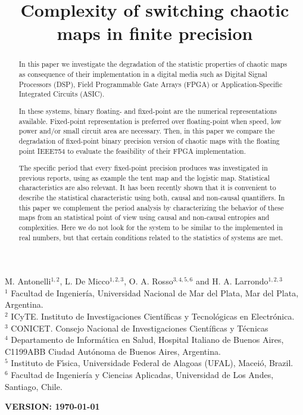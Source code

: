 \begin{frontmatter}

	\title{Complexity of switching chaotic maps in finite precision}
	M. Antonelli$^{1,2}$, L. De Micco$^{1,2,3}$, O. A. Rosso$^{3,4,5,6}$ and H. A. Larrondo$^{1,2,3}$\\
	$^{1}$ Facultad de Ingenier\'ia, Universidad Nacional de Mar del Plata, Mar del Plata, Argentina.\\
	$^{2}$ ICyTE. Instituto de Investigaciones Científicas y Tecnológicas en Electrónica.\\
	$^{3}$ CONICET. Consejo Nacional de Investigaciones Científicas y Técnicas\\
	$^{4}$ Departamento de Inform\'atica en Salud, Hospital Italiano de Buenos Aires, C1199ABB Ciudad Autónoma de Buenos Aires, Argentina.\\
	$^{5}$ Instituto de F\'{\i}sica, Universidade Federal de Alagoas (UFAL), Macei\'o, Brazil.\\
	$^{6}$ Facultad de Ingeniería y Ciencias Aplicadas, Universidad de Los Andes, Santiago, Chile.
	

\begin{abstract}

In this paper we investigate the degradation of the statistic properties of chaotic maps as consequence of their implementation in a digital media such as Digital Signal Processors (DSP), Field Programmable Gate Arrays (FPGA) or Application-Specific Integrated Circuits (ASIC).

In these systems, binary floating- and fixed-point are the numerical representations available.
Fixed-point representation is preferred over floating-point when speed, low power and/or small circuit area are necessary.
Then, in this paper we compare the degradation of fixed-point binary precision version of chaotic maps with the floating point IEEE754 to evaluate the feasibility of their FPGA implementation.

The specific period that every fixed-point precision produces was investigated in previous reports, using as example the tent map and the logistic map.
Statistical characteristics are also relevant.
It has been recently shown that it is convenient to describe the statistical characteristic using both, causal and non-causal quantifiers.
In this paper we complement the period analysis by characterizing the behavior of these maps from an statistical point of view using causal and non-causal entropies and complexities.
Here we do not look for the system to be similar to the implemented in real numbers, but that certain conditions related to the statistics of systems are met.

\end{abstract}
\maketitle
\end{frontmatter}
{\bf VERSION: \today}